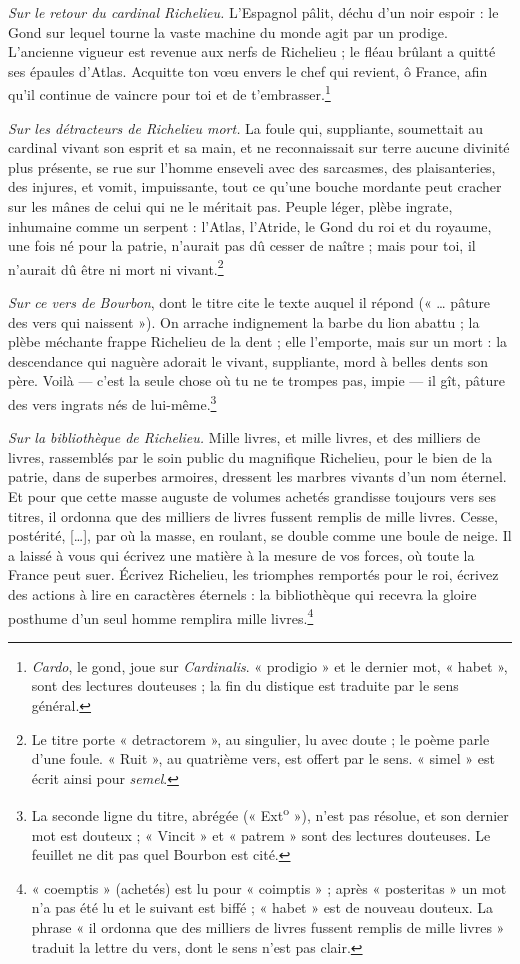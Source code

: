 \documentclass[11pt,a4paper]{article}
\begin{document}
\emph{Sur le retour du cardinal Richelieu.} L'Espagnol pâlit, déchu d'un noir
espoir : le Gond sur lequel tourne la vaste machine du monde agit par un
prodige. L'ancienne vigueur est revenue aux nerfs de Richelieu ; le fléau
brûlant a quitté ses épaules d'Atlas. Acquitte ton vœu envers le chef qui
revient, ô France, afin qu'il continue de vaincre pour toi et de
t'embrasser.\footnote{\emph{Cardo}, le gond, joue sur \emph{Cardinalis}.
« prodigio » et le dernier mot, « habet », sont des lectures douteuses ; la
fin du distique est traduite par le sens général.}

\emph{Sur les détracteurs de Richelieu mort.} La foule qui, suppliante,
soumettait au cardinal vivant son esprit et sa main, et ne reconnaissait sur
terre aucune divinité plus présente, se rue sur l'homme enseveli avec des
sarcasmes, des plaisanteries, des injures, et vomit, impuissante, tout ce
qu'une bouche mordante peut cracher sur les mânes de celui qui ne le méritait
pas. Peuple léger, plèbe ingrate, inhumaine comme un serpent : l'Atlas,
l'Atride, le Gond du roi et du royaume, une fois né pour la patrie, n'aurait
pas dû cesser de naître ; mais pour toi, il n'aurait dû être ni mort ni
vivant.\footnote{Le titre porte « detractorem », au singulier, lu avec
doute ; le poème parle d'une foule. « Ruit », au quatrième vers, est offert
par le sens. « simel » est écrit ainsi pour \emph{semel}.}

\emph{Sur ce vers de Bourbon}, dont le titre cite le texte auquel il répond
(« … pâture des vers qui naissent »). On arrache indignement la barbe du lion
abattu ; la plèbe méchante frappe Richelieu de la dent ; elle l'emporte, mais
sur un mort : la descendance qui naguère adorait le vivant, suppliante, mord
à belles dents son père. Voilà — c'est la seule chose où tu ne te trompes
pas, impie — il gît, pâture des vers ingrats nés de lui-même.\footnote{La
seconde ligne du titre, abrégée (« Ext\textsuperscript{o} »), n'est pas
résolue, et son dernier mot est douteux ; « Vincit » et « patrem » sont des
lectures douteuses. Le feuillet ne dit pas quel Bourbon est cité.}

\emph{Sur la bibliothèque de Richelieu.} Mille livres, et mille livres, et
des milliers de livres, rassemblés par le soin public du magnifique Richelieu,
pour le bien de la patrie, dans de superbes armoires, dressent les marbres
vivants d'un nom éternel. Et pour que cette masse auguste de volumes achetés
grandisse toujours vers ses titres, il ordonna que des milliers de livres
fussent remplis de mille livres. Cesse, postérité, […], par où la masse, en
roulant, se double comme une boule de neige. Il a laissé à vous qui écrivez
une matière à la mesure de vos forces, où toute la France peut suer. Écrivez
Richelieu, les triomphes remportés pour le roi, écrivez des actions à lire en
caractères éternels : la bibliothèque qui recevra la gloire posthume d'un seul
homme remplira mille livres.\footnote{« coemptis » (achetés) est lu pour
« coimptis » ; après « posteritas » un mot n'a pas été lu et le suivant est
biffé ; « habet » est de nouveau douteux. La phrase « il ordonna que des
milliers de livres fussent remplis de mille livres » traduit la lettre du
vers, dont le sens n'est pas clair.}
\end{document}
